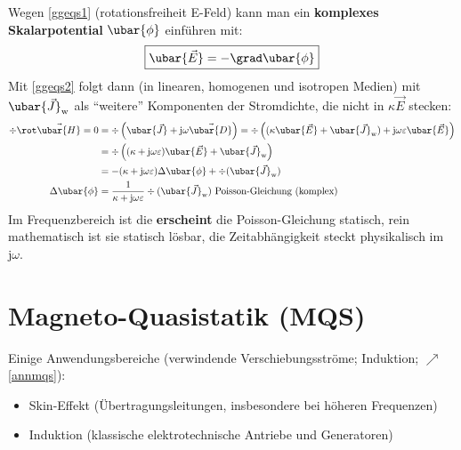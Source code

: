 	  	Wegen \ref{ggeqs1} (rotationsfreiheit E-Feld) kann man ein \textbf{komplexes Skalarpotential} $\ubar{\phi}$ einführen mit:
	  	\begin{equation}
	  		\boxed{\ubar{\vec{E}} = -\grad \ubar{\phi}} 
	  	\end{equation}
	  	Mit \ref{ggeqs2} folgt dann (in linearen, homogenen und isotropen Medien) mit $\ubar{\vec{J}}_\mathrm{w}$ als \enquote{weitere} Komponenten der Stromdichte, die nicht in $\kappa\vec{E}$ stecken:
	  	\begin{align}
	  		\div \rot \vec{\ubar{H}} = 0 & =   \div \left( \ubar{\vec{J}} + \mathrm{j}\omega \vec{\ubar{D}} \right) = \div \left( (\kappa \ubar{\vec{E}} + \ubar{\vec{J}}_\mathrm{w})  + \mathrm{j}\omega \varepsilon \ubar{\vec{E}} \right) \\
	  		& = \div \left( (\kappa+\mathrm{j}\omega \varepsilon) \ubar{\vec{E}} + \ubar{\vec{J}}_\mathrm{w} \right)                                                                                            \\
	  		& = -(\kappa+\mathrm{j}\omega \varepsilon) \Delta \ubar{\phi} + \div (\ubar{\vec{J}}_\mathrm{w} )                                                                                                   \\
	  		\Delta \ubar{\phi}            & = \frac{1}{\kappa+\mathrm{j}\omega \varepsilon}  \div (\ubar{\vec{J}}_\mathrm{w} )  \text{ Poisson-Gleichung (komplex)}
	  	\end{align}
	  	Im Frequenzbereich ist die \textbf{erscheint} die Poisson-Gleichung statisch, rein mathematisch ist sie statisch lösbar, die Zeitabhängigkeit steckt physikalisch im $\mathrm{j}\omega$.
	  \section{Magneto-Quasistatik (MQS)}\label{mqs}
	  	   Einige Anwendungsbereiche (verwindende Verschiebungsströme; Induktion; $\nearrow$ \ref{annmqs}):
	  \begin{itemize}
	  	\item Skin-Effekt (Übertragungsleitungen, insbesondere bei höheren Frequenzen)
	  	\item Induktion (klassische elektrotechnische Antriebe und Generatoren)
	  \end{itemize}
